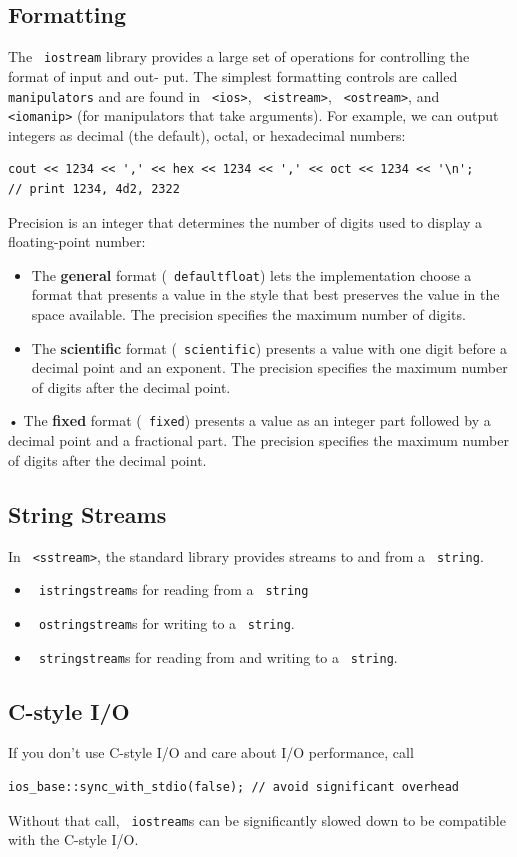 \documentclass[11pt]{article}
\let\OldTexttt\texttt
\renewcommand{\texttt}[1]{\OldTexttt{\color{MidnightBlue} #1}}
\begin{document}
\subsection{Formatting}
\label{sec:org9ad3de4}
The \texttt{iostream} library provides a large set of operations for controlling the format of input and
out- put. The simplest formatting controls are called \texttt{manipulators} and are found in \texttt{<ios>},
\texttt{<istream>}, \texttt{<ostream>}, and \texttt{<iomanip>} (for manipulators that take arguments). For example, we can
output integers as decimal (the default), octal, or hexadecimal numbers:
\begin{verbatim}
cout << 1234 << ',' << hex << 1234 << ',' << oct << 1234 << '\n';
// print 1234, 4d2, 2322
\end{verbatim}

Precision is an integer that determines the number of digits used to display a floating-point number:
\begin{itemize}
\item The \textbf{general} format (\texttt{defaultfloat}) lets the implementation choose a format that presents a
value in the style that best preserves the value in the space available. The precision
specifies the maximum number of digits.
\item The \textbf{scientific} format (\texttt{scientific}) presents a value with one digit before a decimal point and
an exponent. The precision specifies the maximum number of digits after the decimal point.
\end{itemize}
• The \textbf{fixed} format (\texttt{fixed}) presents a value as an integer part followed by a decimal point and
  a fractional part. The precision specifies the maximum number of digits after the decimal point.
\subsection{String Streams}
\label{sec:org56bc4a1}
In \texttt{<sstream>}, the standard library provides streams to and from a \texttt{string}.
\begin{itemize}
\item \texttt{istringstream}s for reading from a \texttt{string}
\item \texttt{ostringstream}s for writing to a \texttt{string}.
\item \texttt{stringstream}s for reading from and writing to a \texttt{string}.
\end{itemize}
\subsection{C-style I/O}
\label{sec:orga68a882}
If you don't use C-style I/O and care about I/O performance, call
\begin{verbatim}
ios_base::sync_with_stdio(false); // avoid significant overhead
\end{verbatim}
Without that call, \texttt{iostream}s can be significantly slowed down to be compatible with the
C-style I/O.
\end{document}

